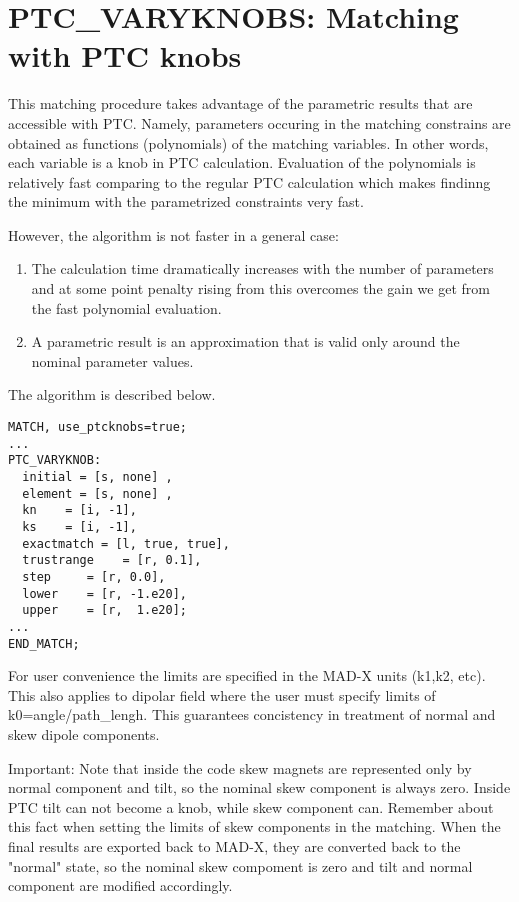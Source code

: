 
\section{PTC\_VARYKNOBS: Matching with PTC knobs}

This matching procedure takes advantage of the parametric results that
are accessible with PTC. Namely, parameters occuring in the matching
constrains are obtained as functions (polynomials) of the matching
variables. In other words, each variable is a knob in PTC
calculation. Evaluation of the polynomials is relatively fast comparing
to the regular PTC calculation which makes findinng the minimum with the
parametrized constraints very fast.  

However, the algorithm is not faster in a general case: 
\begin{enumerate}
   \item  The calculation time dramatically increases with the number of
     parameters and at some point penalty rising from this overcomes the
     gain we get from the fast polynomial evaluation.    
   \item  A parametric result is an approximation that is valid only
     around the nominal parameter values.     
\end{enumerate}

The algorithm is described below. \\
 
\begin{verbatim}
MATCH, use_ptcknobs=true;
...
PTC_VARYKNOB: 
  initial = [s, none] , 
  element = [s, none] , 
  kn    = [i, -1], 
  ks    = [i, -1], 
  exactmatch = [l, true, true], 
  trustrange    = [r, 0.1],  
  step     = [r, 0.0], 
  lower    = [r, -1.e20],
  upper    = [r,  1.e20]; 
...
END_MATCH;
\end{verbatim}

For user convenience the limits are specified in the MAD-X units (k1,k2,
etc). This also applies to dipolar field where the user must specify
limits of k0=angle/path\_lengh. This guarantees concistency in
treatment of normal and skew dipole components.   

Important: Note that inside the code skew magnets are represented only
by  normal component and tilt, so the nominal skew component is always
zero.  Inside PTC tilt can not become a knob, while skew component can.
Remember about this fact when setting the limits of skew components in
the matching.  When the final results are exported back to MAD-X, they
are converted back to the "normal" state, so the nominal skew compoment
is zero and tilt and  normal component are modified accordingly.     

